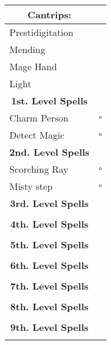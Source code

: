 \documentclass[11pt]{article}
\newcommand{\available}{$\square$}
\begin{document}
	\begin{tabularx}{\textwidth}{X|r}
\multicolumn{1}{c|}{\large \textbf{Cantrips}:} & \\
\hline
Prestidigitation 								& 	\\
Mending 										& 	\\
Mage Hand		 								&	\\
Light			 								&	\\

\multicolumn{1}{c|}{\large \textbf{1st. Level Spells}} & \\
\hline
Charm Person	 								& \available \\
Detect Magic 									& \available \\

\multicolumn{1}{c|}{\large \textbf{2nd. Level Spells}} &	\\
\hline
Scorching Ray									& \available \\
Misty step										& \available \\

\multicolumn{1}{c|}{\large \textbf{3rd. Level Spells}} & \\
\hline
 												&  	\\

\multicolumn{1}{c|}{\large \textbf{4th. Level Spells}} & \\
\hline
 												&  	\\

\multicolumn{1}{c|}{\large \textbf{5th. Level Spells}} & \\
\hline
	 											&  	\\

\multicolumn{1}{c|}{\large \textbf{6th. Level Spells}} & \\
\hline
	 											&  	\\

\multicolumn{1}{c|}{\large \textbf{7th. Level Spells}} & \\
\hline
	 											&  	\\

\multicolumn{1}{c|}{\large \textbf{8th. Level Spells}} & \\
\hline
	 											&  	\\

\multicolumn{1}{c|}{\large \textbf{9th. Level Spells}} & \\
\hline
	 											&  	\\
	\end{tabularx}

\clearpage
\end{document}
